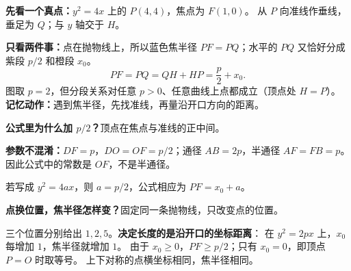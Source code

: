\clearpage
\begin{explanationbox}
\textbf{先看一个真点：}$y^2=4x$ 上的 $P(4,4)$，焦点为 $F(1,0)$。
从 $P$ 向准线作垂线，垂足为 $Q$；与 $y$ 轴交于 $H$。
\begin{center}\end{center}
\textbf{只看两件事：}点在抛物线上，所以蓝色焦半径 $PF=PQ$；水平的 $PQ$ 又恰好分成紫段 $p/2$ 和橙段 $x_0$。
\[
  \boxed{PF=PQ=QH+HP=\frac p2+x_0}.
\]
图取 $p=2$，但分段关系对任意 $p>0$、任意曲线上点都成立（顶点处 $H=P$）。
\textbf{记忆动作：}遇到焦半径，先找准线，再量沿开口方向的距离。
\end{explanationbox}
\clearpage
\begin{explanationbox}
\textbf{公式里为什么加 $p/2$？}顶点在焦点与准线的正中间。
\begin{center}\end{center}
\textbf{参数不混淆：}$DF=p$，$DO=OF=p/2$；通径 $AB=2p$，半通径 $AF=FB=p$。
因此公式中的常数是 $OF$，不是半通径。

\medskip
若写成 $y^2=4ax$，则 $a=p/2$，公式相应为 $PF=x_0+a$。
\end{explanationbox}

\clearpage
\begin{explanationbox}
\textbf{点换位置，焦半径怎样变？}固定同一条抛物线，只改变点的位置。
\begin{center}\end{center}
三个位置分别给出 $1,2,5$。\textbf{决定长度的是沿开口的坐标距离}：
在 $y^2=2px$ 上，$x_0$ 每增加 $1$，焦半径就增加 $1$。
由于 $x_0\ge0$，$PF\ge p/2$；只有 $x_0=0$，即顶点 $P=O$ 时取等号。
上下对称的点横坐标相同，焦半径相同。
\end{explanationbox}
